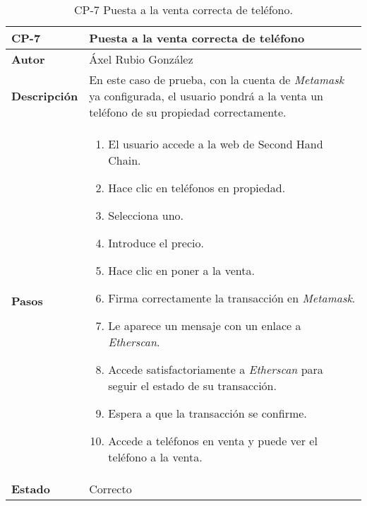 \begin{table}[p]
	\centering
	\begin{tabularx}{\linewidth}{ p{} p{} }
		\toprule
		\textbf{CP-7}    & \textbf{Puesta a la venta correcta de teléfono}\\
		\toprule
		\textbf{Autor}                & Áxel Rubio González \\
		\textbf{Descripción}          & En este caso de prueba, con la cuenta de \textit{Metamask} ya configurada, el usuario pondrá a la venta un teléfono de su propiedad correctamente. \\
		\textbf{Pasos}             &
		\begin{enumerate}
			\def\labelenumi{\arabic{enumi}.}
			\tightlist
			\item El usuario accede a la web de Second Hand Chain.
                \item Hace clic en teléfonos en propiedad.
                \item Selecciona uno.
                \item Introduce el precio.
                \item Hace clic en poner a la venta.
                \item Firma correctamente la transacción en \textit{Metamask}.
                \item Le aparece un mensaje con un enlace a \textit{Etherscan}.
                \item Accede satisfactoriamente a \textit{Etherscan} para seguir el estado de su transacción.
                \item Espera a que la transacción se confirme.
                \item Accede a teléfonos en venta y puede ver el teléfono a la venta.
		\end{enumerate}\\
		\textbf{Estado}          & Correcto \\
		\bottomrule
	\end{tabularx}
	\caption{CP-7 Puesta a la venta correcta de teléfono.}
\end{table}

